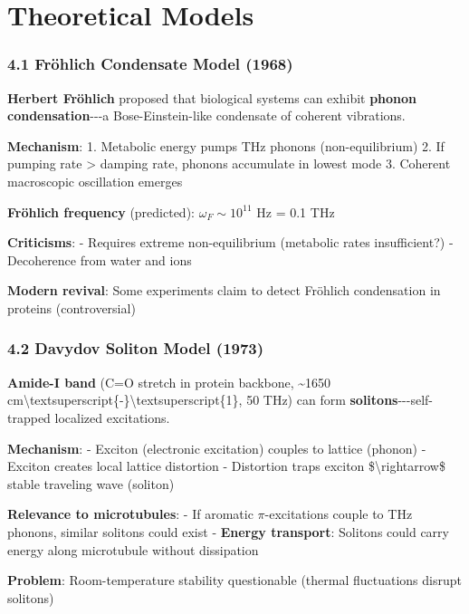 \section{Theoretical Models}

\subsubsection{4.1 Fröhlich Condensate Model
(1968)}\label{fruxf6hlich-condensate-model-1968}

\textbf{Herbert Fröhlich} proposed that biological systems can exhibit
\textbf{phonon condensation}-\/-\/-a Bose-Einstein-like condensate of
coherent vibrations.

\textbf{Mechanism}: 1. Metabolic energy pumps THz phonons
(non-equilibrium) 2. If pumping rate \textgreater{} damping rate,
phonons accumulate in lowest mode 3. Coherent macroscopic oscillation
emerges

\textbf{Fröhlich frequency} (predicted): \(\omega_F \sim 10^{11}\) Hz =
0.1 THz

\textbf{Criticisms}: - Requires extreme non-equilibrium (metabolic rates
insufficient?) - Decoherence from water and ions

\textbf{Modern revival}: Some experiments claim to detect Fröhlich
condensation in proteins (controversial)

\subsubsection{4.2 Davydov Soliton Model
(1973)}\label{davydov-soliton-model-1973}

\textbf{Amide-I band} (C=O stretch in protein backbone,
\textasciitilde1650
cm\textbackslash textsuperscript\{-\}\textbackslash textsuperscript\{1\},
50 THz) can form \textbf{solitons}-\/-\/-self-trapped localized
excitations.

\textbf{Mechanism}: - Exciton (electronic excitation) couples to lattice
(phonon) - Exciton creates local lattice distortion - Distortion traps
exciton \$\textbackslash rightarrow\$ stable traveling wave (soliton)

\textbf{Relevance to microtubules}: - If aromatic \(\pi\)-excitations
couple to THz phonons, similar solitons could exist - \textbf{Energy
transport}: Solitons could carry energy along microtubule without
dissipation

\textbf{Problem}: Room-temperature stability questionable (thermal
fluctuations disrupt solitons)

